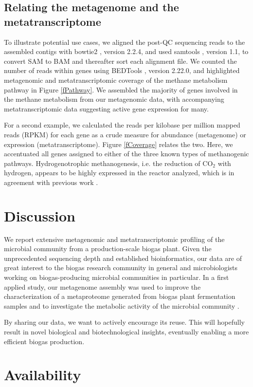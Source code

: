 \documentclass{bmcart}
\begin{document}
\subsection*{Relating the metagenome and the metatranscriptome}
To illustrate potential use cases, we aligned the post-QC sequencing reads to the assembled contigs with bowtie2 \cite{Bowtie2}, version 2.2.4, and used samtools \cite{Samtools}, version 1.1, to convert SAM to BAM and thereafter sort each alignment file. We counted the number of reads within genes using BEDTools \cite{BEDTools}, version 2.22.0, and highlighted metagenomic and metatranscriptomic coverage of the methane metabolism pathway in Figure \ref{fPathway}. We assembled the majority of genes involved in the methane metabolism from our metagenomic data, with accompanying metatranscriptomic data suggesting active gene expression for many.

For a second example, we calculated the reads per kilobase per million mapped reads (RPKM) for each gene as a crude measure for abundance (metagenome) or expression (metatranscriptome).
Figure \ref{fCoverage} relates the two. Here, we accentuated all genes assigned to either of the three known types of methanogenic pathways.
Hydrogenotrophic methanogenesis, i.e. the reduction of CO$_{\text{2}}$ with hydrogen, appears to be highly expressed in the reactor analyzed, which is in agreement with previous work \cite{Zakrzewski2012}.

\section*{Discussion}

We report extensive metagenomic and metatranscriptomic profiling of the microbial community from a production-scale biogas plant.
Given the unprecedented sequencing depth and established bioinformatics, our data are of great interest to the biogas research community in general and microbiologists working on biogas-producing microbial communities in particular.
In a first applied study, our metagenome assembly was used to improve the characterization of a metaproteome generated from biogas plant fermentation samples and to investigate the metabolic activity of the microbial community \cite{Kohrs2015}.

By sharing our data, we want to actively encourage its reuse. This will hopefully result in novel biological and biotechnological insights, eventually enabling a more efficient biogas production.

\section*{Availability}
\end{document}
